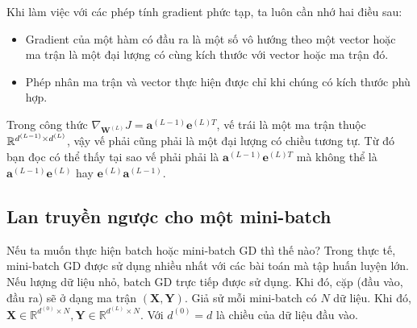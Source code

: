 Khi làm việc với các phép tính gradient phức tạp, ta luôn cần nhớ hai điều sau:
\begin{itemize}
\item Gradient của một hàm có đầu ra là một số vô hướng theo một vector hoặc
ma trận là một đại lượng có cùng kích thước với vector hoặc ma trận đó.

\item Phép nhân ma trận và vector thực hiện được chỉ khi chúng có kích thước phù hợp.
\end{itemize}

Trong công thức $ \nabla_{\mathbf{W}^{(L)}}J =
\mathbf{a}^{(L-1)}\mathbf{e}^{(L)T}$, vế trái là một ma trận thuộc
$\mathbb{R}^{d^{(L-1)}\times d^{(L)}}$, vậy vế phải cũng phải là một đại lượng có chiều
tương tự. Từ đó bạn đọc có thể thấy tại sao vế phải phải là
$\mathbf{a}^{(L-1)}\mathbf{e}^{(L)T}$ mà không thể là
$\mathbf{a}^{(L-1)}\mathbf{e}^{(L)}$ hay $\mathbf{e}^{(L)}\mathbf{a}^{(L-1)}$.





\subsection{Lan truyền ngược cho một mini-batch}

Nếu ta muốn thực hiện batch hoặc mini-batch GD thì thế nào? Trong thực tế,
mini-batch GD được sử dụng nhiều nhất với các bài toán mà tập huấn luyện lớn.
Nếu lượng dữ liệu nhỏ, batch GD trực tiếp được sử dụng. Khi đó, cặp (đầu vào,
đầu ra) sẽ ở dạng ma trận $(\mathbf{X, Y})$. Giả sử
mỗi mini-batch có $N$ dữ liệu. Khi đó, $\mathbf{X} \in \mathbb{R}^{d^{(0)} \times N}, \mathbf{Y} \in \mathbb{R}^{d^{(L)}\times N}$. Với $d^{(0)} = d$ là chiều của dữ liệu đầu vào.

